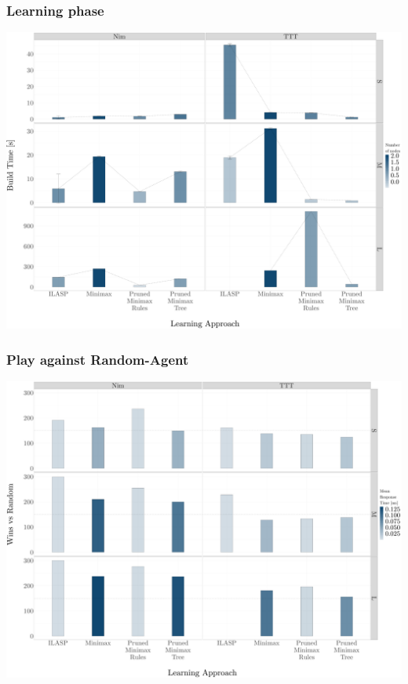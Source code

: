 \documentclass{beamer}
\begin{document}
\begin{framefont}{\footnotesize}
  \begin{frame}
    \frametitle{Learning phase}
    \includegraphics[width=\textwidth,height=0.9\textheight,keepaspectratio]{bar_build.pdf}
  \end{frame}
\end{framefont}


\begin{framefont}{\footnotesize}
  \begin{frame}
    \frametitle{Play against Random-Agent}
    \includegraphics[width=\textwidth,height=0.9\textheight,keepaspectratio]{bar_vs.pdf}
  \end{frame}
\end{framefont}
\end{document}
